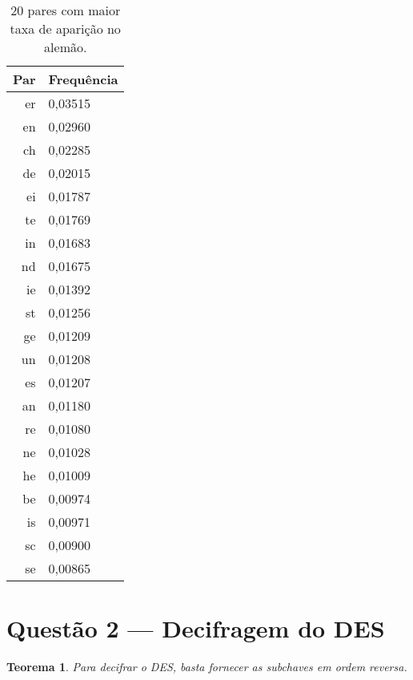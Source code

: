 \documentclass{article}
\newtheorem{theorem}{Teorema}
\begin{document}
\begin{table}[h]
    \centering
    \begin{tabular}{r l}
        Par & Frequência \\\hline
        er & 0,03515 \\
        en & 0,02960 \\
        ch & 0,02285 \\
        de & 0,02015 \\
        ei & 0,01787 \\
        te & 0,01769 \\
        in & 0,01683 \\
        nd & 0,01675 \\
        ie & 0,01392 \\
        st & 0,01256 \\
        ge & 0,01209 \\
        un & 0,01208 \\
        es & 0,01207 \\
        an & 0,01180 \\
        re & 0,01080 \\
        ne & 0,01028 \\
        he & 0,01009 \\
        be & 0,00974 \\
        is & 0,00971 \\
        sc & 0,00900 \\
        se & 0,00865 \\
    \end{tabular}
    \caption{20 pares com maior taxa de aparição no alemão.}
    \label{pares}
\end{table}

\section{Questão 2 --- Decifragem do DES}

\begin{theorem}
    Para decifrar o DES, basta fornecer as subchaves em ordem reversa.
\end{theorem}
\end{document}
